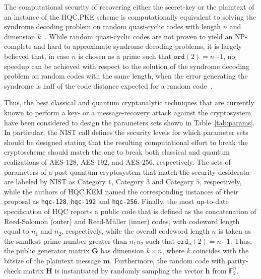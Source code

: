 \smallskip
\noindent The computational security of recovering either the secret-key or the plaintext of an instance of the HQC.PKE scheme is computationally equivalent to solving the syndrome decoding problem on random quasi-cyclic codes with length $n$ and dimension $k$~\cite{DBLP:journals/tit/Aguilar-Melchor18}. 
While random quasi-cyclic codes are not proven to yield an NP-complete and hard 
to approximate syndrome decoding problems, it is largely believed that, in case 
$n$ is chosen as a prime such that $\mathtt{ord}(2)$$=$$n$$-$$1$, no speedup 
can be achieved with respect to the solution of the syndrome decoding problem
on random codes with the same length, when the error generating the syndrome 
is half of the code distance expected for a random code~\cite{DBLP:journals/tit/Aguilar-Melchor18}.

Thus, the best classical and quantum cryptanalytic techniques that are currently 
known to perform a key- or a message-recovery attack against the cryptosystem 
have been considered to design the parameters sets shown in Table~\ref{tab:params}. 
In particular, the NIST call defines the security levels for which parameter
sets should be designed stating that the resulting computational effort to 
break the cryptoscheme should match the one to break both classical and quantum realizations of AES-$128$, AES-$192$, and AES-$256$, respectively.
The sets of parameters of a post-quantum cryptosystem that match the security 
desiderata are labeled by NIST as Category $1$, Category $3$ and Category $5$, 
respectively, while the authors of HQC.KEM named the corresponding instances of 
their proposal as \texttt{hqc-128}, \texttt{hqc-192} and \texttt{hqc-256}.
% 
Finally, the most up-to-date specification of HQC reports a public code that is 
defined as the concatenation of Reed-Solomon (outer) and Reed-M\"{u}ller (inner) 
codes, with codeword length equal to $n_1$ and $n_2$, respectively, while the overall 
codeword length $n$ is taken as the smallest prime number greater than $n_1n_2$ 
such that $\mathtt{ord}_n(2)$$=$$n$$-$$1$. Thus, the public generator matrix 
$\mathbf{G}$ has dimension $k\times n$, where $k$ coincides with the bitsize of 
the plaintext message $\mathbf{m}$. Furthermore, the random code with 
parity-check matrix $\mathbf{H}$ is instantiated by randomly sampling the 
vector $\mathbf{h}$ from $\mathds{F}_2^n$. 
